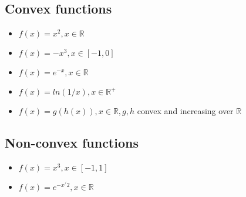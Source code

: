 \subsection{Convex functions}
\begin{itemize}
\item $f(x) = x^2, x \in \mathbb{R}$
\item $f(x) = -x^3, x \in [-1,0]$
\item $f(x) = e^{-x}, x \in \mathbb{R}$
\item $f(x) = ln(1/x), x \in \mathbb{R^+}$
\item $f(x) = g(h(x)), x \in \mathbb{R}, g,h$ convex and increasing over $\mathbb{R}$
\end{itemize}

\subsection{Non-convex functions}
\begin{itemize}
\item $f(x) = x^3, x \in [-1,1]$
\item $f(x) = e^{-x^/2}, x \in \mathbb{R}$

\end{itemize}